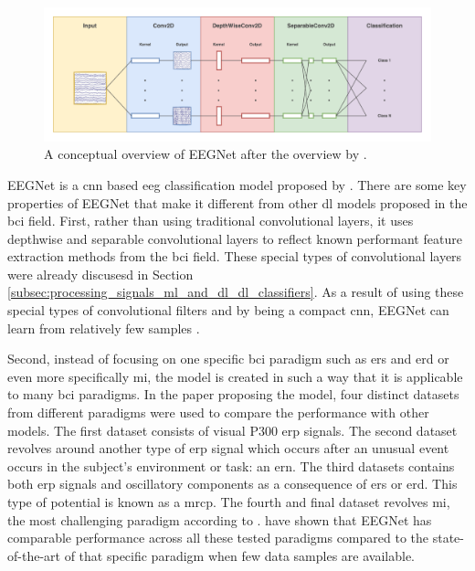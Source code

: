 \begin{figure}[t]
    \centering
    \includegraphics[width=\linewidth]{../images/pipeline/eegnet_intuitive.pdf}
    \captionsetup{width=0.8\linewidth}
    \captionsetup{justification=centering}
    \caption{A conceptual overview of EEGNet after the overview by \citet{eeg_model_eegnet}.}
    \label{fig:offline_bci_system_dl_eegnet_intuitive}
\end{figure}

EEGNet is a \gls{cnn} based \gls{eeg} classification model proposed by \citet{eeg_model_eegnet}.
There are some key properties of EEGNet that make it different from other \gls{dl} models proposed in the \gls{bci} field.
First, rather than using traditional convolutional layers, it uses depthwise and separable convolutional layers to reflect known performant feature extraction methods from the \gls{bci} field.
These special types of convolutional layers were already discusesd in Section \ref{subsec:processing_signals_ml_and_dl_dl_classifiers}.
As a result of using these special types of convolutional filters and by being a compact \gls{cnn}, EEGNet can learn from relatively few samples \citep{eeg_model_eegnet}.

Second, instead of focusing on one specific \gls{bci} paradigm such as \gls{ers} and \gls{erd} or even more specifically \gls{mi}, the model is created in such a way that it is applicable to many \gls{bci} paradigms.
In the paper proposing the model, four distinct datasets from different paradigms were used to compare the performance with other models.
The first dataset consists of visual P300 \gls{erp} signals.
The second dataset revolves around another type of \gls{erp} signal which occurs after an unusual event occurs in the subject's environment or task: an \gls{ern}.
The third datasets contains both \gls{erp} signals and oscillatory components as a consequence of \gls{ers} or \gls{erd}.
This type of potential is known as a \gls{mrcp}.
The fourth and final dataset revolves \gls{mi}, the most challenging paradigm according to \citet{eeg_model_eegnet}.
\citet{eeg_model_eegnet} have shown that EEGNet has comparable performance across all these tested paradigms compared to the state-of-the-art of that specific paradigm when few data samples are available.

